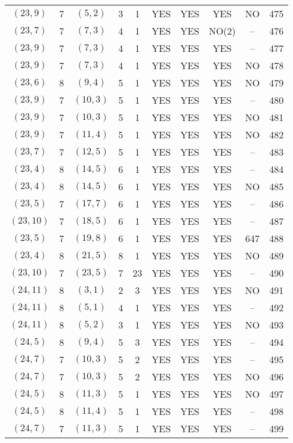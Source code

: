 \begin{longtable}{|c|c|c|c|c|c|c|c|c|c|}
$(23, 9)$ & 7 & $(5, 2)$ & 3 & 1 & YES & YES & YES & NO & 475\\
$(23, 7)$ & 7 & $(7, 3)$ & 4 & 1 & YES & YES & NO(2) & -- & 476\\
$(23, 9)$ & 7 & $(7, 3)$ & 4 & 1 & YES & YES & YES & -- & 477\\
$(23, 9)$ & 7 & $(7, 3)$ & 4 & 1 & YES & YES & YES & NO & 478\\
$(23, 6)$ & 8 & $(9, 4)$ & 5 & 1 & YES & YES & YES & NO & 479\\
$(23, 9)$ & 7 & $(10, 3)$ & 5 & 1 & YES & YES & YES & -- & 480\\
$(23, 9)$ & 7 & $(10, 3)$ & 5 & 1 & YES & YES & YES & NO & 481\\
$(23, 9)$ & 7 & $(11, 4)$ & 5 & 1 & YES & YES & YES & NO & 482\\
$(23, 7)$ & 7 & $(12, 5)$ & 5 & 1 & YES & YES & YES & -- & 483\\
$(23, 4)$ & 8 & $(14, 5)$ & 6 & 1 & YES & YES & YES & -- & 484\\
$(23, 4)$ & 8 & $(14, 5)$ & 6 & 1 & YES & YES & YES & NO & 485\\
$(23, 5)$ & 7 & $(17, 7)$ & 6 & 1 & YES & YES & YES & -- & 486\\
$(23, 10)$ & 7 & $(18, 5)$ & 6 & 1 & YES & YES & YES & -- & 487\\
$(23, 5)$ & 7 & $(19, 8)$ & 6 & 1 & YES & YES & YES & 647 & 488\\
$(23, 4)$ & 8 & $(21, 5)$ & 8 & 1 & YES & YES & YES & NO & 489\\
$(23, 10)$ & 7 & $(23, 5)$ & 7 & 23 & YES & YES & YES & -- & 490\\
$(24, 11)$ & 8 & $(3, 1)$ & 2 & 3 & YES & YES & YES & NO & 491\\
$(24, 11)$ & 8 & $(5, 1)$ & 4 & 1 & YES & YES & YES & -- & 492\\
$(24, 11)$ & 8 & $(5, 2)$ & 3 & 1 & YES & YES & YES & NO & 493\\
$(24, 5)$ & 8 & $(9, 4)$ & 5 & 3 & YES & YES & YES & -- & 494\\
$(24, 7)$ & 7 & $(10, 3)$ & 5 & 2 & YES & YES & YES & -- & 495\\
$(24, 7)$ & 7 & $(10, 3)$ & 5 & 2 & YES & YES & YES & NO & 496\\
$(24, 5)$ & 8 & $(11, 3)$ & 5 & 1 & YES & YES & YES & NO & 497\\
$(24, 5)$ & 8 & $(11, 4)$ & 5 & 1 & YES & YES & YES & -- & 498\\
$(24, 7)$ & 7 & $(11, 3)$ & 5 & 1 & YES & YES & YES & -- & 499\\

\end{longtable}
